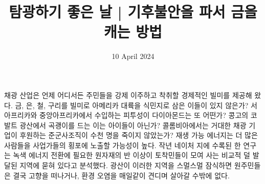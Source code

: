 \documentclass{translation}
\date{10 April 2024}
\title{탐광하기 좋은 날 | 기후불안을 파서 금을 캐는 방법}
\begin{document}
채광 산업은 언제 어디서든 주민들을 강제 이주하고 착취할 경제적인 빌미를 제공해 왔다.
금, 은, 철, 구리를 빌미로 아메리카 대륙을 식민지로 삼은 이들이 있지 않은가?
서아프리카와 중앙아프리카에서 수입하는 피투성이 다이아몬드는 또 어떤가?
콩고의 코발트 광산에서 곡괭이를 드는 이는 아이들이 아닌가?
콜롬비아에서는 거대한 채광 기업이 후원하는 준군사조직이 수천 명을 죽이지 않았는가?
재생 가능 에너지는 더 많은 사람들을 사업가들의 횡포에 노출할 가능성이 높다.
작년 네이처 지에 수록된 한 연구는 녹색 에너지 전환에 필요한 원자재의 반 이상이 토착민들이 모여 사는 비교적 덜 발달된 지역에 묻혀 있다고 분석했다.
광산이 이러한 지역을 스멀스멀 잠식하면 원주민들은 결국 고향을 떠나거나, 환경 오염을 매일같이 견디며 살아갈 수밖에 없다.
% 
\end{document}
